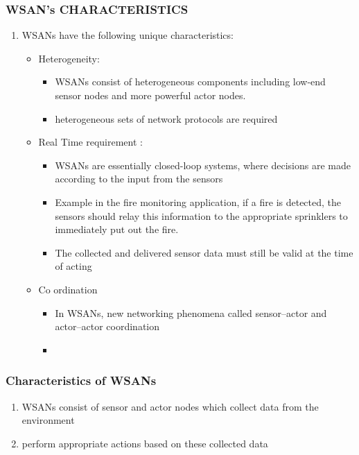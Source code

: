 \documentclass[11pt]{class}
\begin{document}
		\begin{frame}
			\frametitle{WSAN's CHARACTERISTICS}
			\begin{enumerate}
				\item WSANs have the following unique characteristics:
					\begin{itemize}
						\item Heterogeneity: 
						\begin{itemize}
							\item WSANs consist of heterogeneous components including low-end sensor nodes and more powerful actor nodes.
							\item heterogeneous sets of network protocols are required
						\end{itemize}
						\item Real Time requirement :
						\begin{itemize}
							\item  WSANs are essentially closed-loop systems, where decisions are made according to the input from the sensors
							\item Example in the fire monitoring application, if a fire is detected, the sensors should relay this information to the appropriate sprinklers to immediately put out the fire. 
							\item The collected and delivered sensor data must still be valid at the time of acting
						\end{itemize}
						\item Co ordination
							\begin{itemize}
								\item In WSANs, new networking phenomena called sensor–actor and actor–actor coordination 
								\item 
							\end{itemize}
					\end{itemize}
						
							\end{enumerate}
						\end{frame}
						\begin{frame}
							\frametitle{Characteristics of WSANs}
							\begin{enumerate}
								\item WSANs consist of sensor and actor nodes which collect data from the environment
								\item perform appropriate actions based on these collected data
							\end{enumerate}
								\end{frame}
\end{document}
